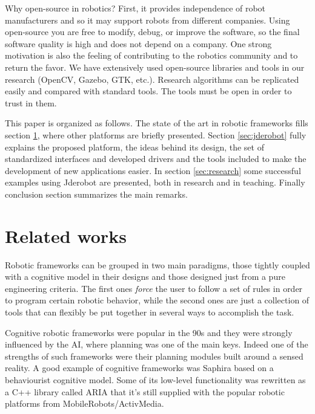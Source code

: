 \documentclass[twocolumn]{svjour3}          %
\begin{document}
Why open-source in robotics? First, it provides independence of robot manufacturers and so it may support robots from different companies. Using open-source you are free to modify, debug, or improve the software, so the final software quality is high and does not depend on a company. One strong motivation is also the feeling of contributing to the robotics community and to return the favor. We have extensively used open-source libraries and tools in our research (OpenCV, Gazebo, GTK, etc.). Research algorithms can be replicated easily and compared with standard tools. The tools must be open in order to trust in them.

This paper is organized as follows. The state of the art in robotic
frameworks fills section \ref{sec:relatedworks}, where other platforms
are briefly presented. Section \ref{sec:jderobot} fully explains the
proposed platform, the ideas behind its design, the set of standardized
interfaces and developed drivers and the tools included to make the
development of new applications easier. In section \ref{sec:research} some successful examples using Jderobot are presented, both in research and in teaching. Finally conclusion section summarizes the main remarks.

\section{Related works}
\label{sec:relatedworks}

Robotic frameworks can be grouped in two main paradigms, those tightly
coupled with a cognitive model in their designs and those designed
just from a pure engineering criteria. The first ones \textit{force}
the user to follow a set of rules in order to program certain robotic
behavior, while the second ones are just a collection of tools that
can flexibly be put together in several ways to accomplish the task.

Cognitive robotic frameworks were popular in the 90s and they were
strongly influenced by the AI, where planning was one of the main
keys. Indeed one of the strengths of such frameworks were their
planning modules built around a sensed reality. A good example of cognitive
frameworks was Saphira \cite{konolige98} based on a behaviourist
cognitive model. Some of its low-level functionality was rewritten as a
C++ library called ARIA \cite{aria} that it's still supplied with the
popular robotic platforms from MobileRobots/ActivMedia.
\end{document}
